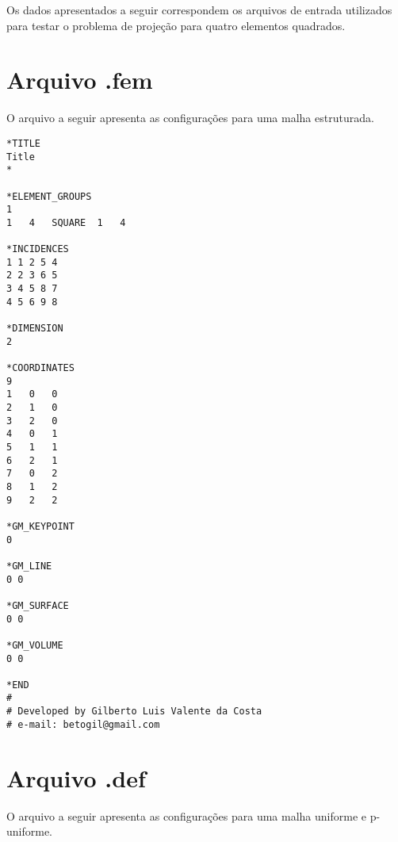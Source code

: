 
\begin{center}
\label{AnexoA}
\end{center}

Os dados apresentados a seguir correspondem os arquivos de entrada utilizados para testar o problema
de projeção para quatro elementos quadrados.

\section{Arquivo .fem}\label{AnexoA:fem}

O arquivo a seguir apresenta as configurações para uma malha estruturada.

{\footnotesize
\begin{verbatim}
*TITLE
Title
*

*ELEMENT_GROUPS
1
1   4   SQUARE  1   4

*INCIDENCES
1 1 2 5 4
2 2 3 6 5
3 4 5 8 7
4 5 6 9 8

*DIMENSION
2

*COORDINATES
9
1   0   0
2   1   0
3   2   0
4   0   1
5   1   1
6   2   1
7   0   2
8   1   2
9   2   2

*GM_KEYPOINT
0

*GM_LINE
0 0

*GM_SURFACE
0 0

*GM_VOLUME
0 0

*END
#
# Developed by Gilberto Luis Valente da Costa
# e-mail: betogil@gmail.com
\end{verbatim}
}

\clearpage

\section{Arquivo .def}\label{AnexoA:def}

O arquivo a seguir apresenta as configurações para uma malha uniforme e p-uniforme.


